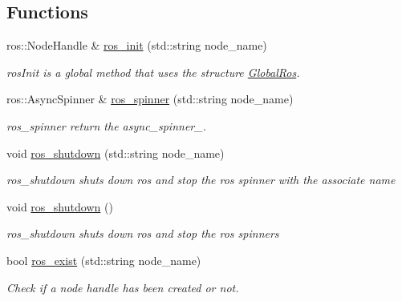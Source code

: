 \subsection*{Functions}
\begin{DoxyCompactItemize}
\item 
ros\+::\+Node\+Handle \& \hyperlink{namespacedynamic__graph_ab01ece41a91a029cf335e28548cdfc06}{ros\+\_\+init} (std\+::string node\+\_\+name)
\begin{DoxyCompactList}\small\item\em ros\+Init is a global method that uses the structure \hyperlink{structdynamic__graph_1_1GlobalRos}{Global\+Ros}. \end{DoxyCompactList}\item 
ros\+::\+Async\+Spinner \& \hyperlink{namespacedynamic__graph_a0ab97e95b56e05d30fd3112f8dfcf8eb}{ros\+\_\+spinner} (std\+::string node\+\_\+name)
\begin{DoxyCompactList}\small\item\em ros\+\_\+spinner return the async\+\_\+spinner\+\_\+. \end{DoxyCompactList}\item 
\mbox{\label{namespacedynamic__graph_a0a7d6cd6c123bd1852af188fc06ce4f7}} 
void \hyperlink{namespacedynamic__graph_a0a7d6cd6c123bd1852af188fc06ce4f7}{ros\+\_\+shutdown} (std\+::string node\+\_\+name)
\begin{DoxyCompactList}\small\item\em ros\+\_\+shutdown shuts down ros and stop the ros spinner with the associate name \end{DoxyCompactList}\item 
\mbox{\label{namespacedynamic__graph_a7d2045abc7e02fe4ee746c5cbb937b04}} 
void \hyperlink{namespacedynamic__graph_a7d2045abc7e02fe4ee746c5cbb937b04}{ros\+\_\+shutdown} ()
\begin{DoxyCompactList}\small\item\em ros\+\_\+shutdown shuts down ros and stop the ros spinners \end{DoxyCompactList}\item 
\mbox{\label{namespacedynamic__graph_ab000cd6e1e6ed365a5a3e1adddf89dff}} 
bool \hyperlink{namespacedynamic__graph_ab000cd6e1e6ed365a5a3e1adddf89dff}{ros\+\_\+exist} (std\+::string node\+\_\+name)
\begin{DoxyCompactList}\small\item\em Check if a node handle has been created or not. \end{DoxyCompactList}\item 

\end{DoxyCompactItemize}
